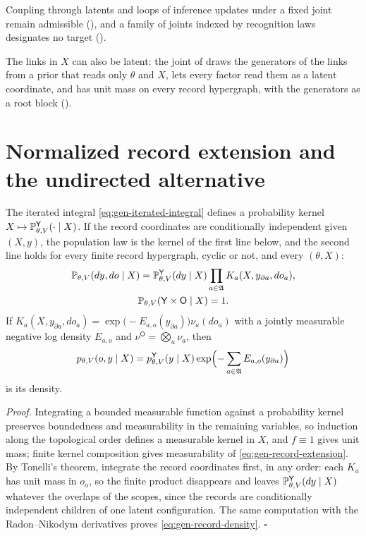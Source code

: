 Coupling through latents and loops of inference updates under a fixed joint remain admissible
(), and a family of joints indexed by recognition laws designates no
target ().

The links in $X$ can also be latent: the joint of  draws the generators of the
links from a prior that reads only $\theta$ and $X$, lets every factor read them as a latent coordinate,
and has unit mass on every record hypergraph, with the generators as a root block
().

\section{Normalized record extension and the undirected alternative}
\label{sec:gen-normalization}
\label{sec:gen-undirected}

The iterated integral \eqref{eq:gen-iterated-integral} defines a probability kernel
$X\mapsto\mathbb P_{\theta,V}^{\mathsf Y}(\cdot\mid X)$. If the record coordinates are conditionally
independent given $(X,y)$, the population law is the kernel of the first line below, and the second
line holds for every finite record hypergraph, cyclic or not, and every $(\theta,X)$:
\begin{gather}
\mathbb P_{\theta,V}(dy,do\mid X)
=\mathbb P_{\theta,V}^{\mathsf Y}(dy\mid X)\prod_{a\in\mathfrak A}K_a(X,y_{\partial a},do_a),
\label{eq:gen-record-extension}\\
\mathbb P_{\theta,V}(\mathsf Y\times\mathsf O\mid X)=1.
\label{eq:gen-normalization}
\end{gather}
If $K_a(X,y_{\partial a},do_a)=\exp\bigl(-E_{a,o}(y_{\partial a})\bigr)\nu_a(do_a)$ with a jointly measurable
negative log density $E_{a,o}$ and $\nu^{\mathsf O}=\bigotimes_{a}\nu_a$, then
\begin{equation}
p_{\theta,V}(o,y\mid X)
=p_{\theta,V}^{\mathsf Y}(y\mid X)\exp\Bigl(-\sum_{a\in\mathfrak A}E_{a,o}(y_{\partial a})\Bigr)
\label{eq:gen-record-density}
\end{equation}
is its density. 

\noindent\emph{Proof.}
Integrating a bounded measurable function against a probability kernel preserves boundedness and
measurability in the remaining variables, so induction along the topological order defines a measurable
kernel in $X$, and $f\equiv1$ gives unit mass; finite kernel composition gives measurability of
\eqref{eq:gen-record-extension}. By Tonelli's theorem, integrate the record coordinates first, in any
order: each $K_a$ has unit mass in $o_a$, so the finite product disappears and leaves
$\mathbb P_{\theta,V}^{\mathsf Y}(dy\mid X)$ whatever the overlaps of the scopes, since the records are
conditionally independent children of one latent configuration. The same computation with the
Radon--Nikodym derivatives proves \eqref{eq:gen-record-density}. \hfill$\square$

